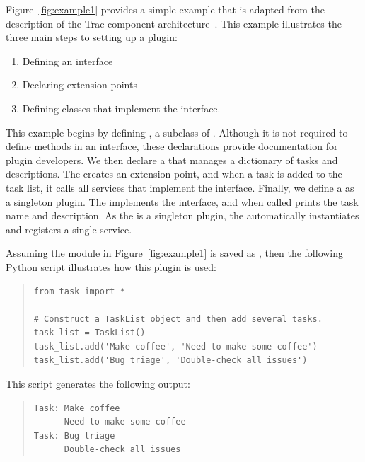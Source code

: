 Figure~\ref{fig:example1} provides a simple example that is adapted from
the description of the Trac component architecture~\cite{TCA}. This
example illustrates the three main steps to setting up a plugin: 
\begin{enumerate}
\item Defining an interface
\item Declaring extension points
\item Defining classes that implement the interface. 
\end{enumerate}
This example begins by defining , a subclass of . 
Although it is not required to define methods in an interface, these
declarations provide documentation for plugin developers.
We then declare a  that manages a
dictionary of tasks and descriptions.  The  creates an
 extension point, and when a task is added to the
task list, it calls all services that implement the 
interface.  Finally, we define a  as a singleton
plugin.  The  implements the 
interface, and when called prints the task name and description.  As the
 is a singleton plugin, the \pcasp automatically
instantiates and registers a single  service.



Assuming the module in Figure~\ref{fig:example1} 
is saved as , then the following Python script 
illustrates how this plugin is used:
\begin{quotation}
\begin{lstlisting}
from task import *

# Construct a TaskList object and then add several tasks.
task_list = TaskList()
task_list.add('Make coffee', 'Need to make some coffee')
task_list.add('Bug triage', 'Double-check all issues')
\end{lstlisting}
\end{quotation}
This script generates the following output:
\begin{quotation}
\begin{lstlisting}
Task: Make coffee
      Need to make some coffee
Task: Bug triage
      Double-check all issues
\end{lstlisting}
\end{quotation}


